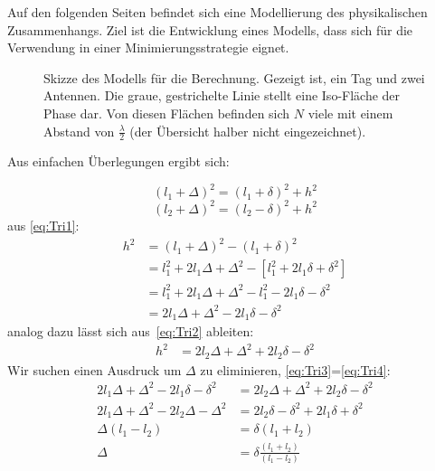 Auf den folgenden Seiten befindet sich eine Modellierung des physikalischen Zusammenhangs. Ziel ist die Entwicklung eines Modells, dass sich für die Verwendung in einer Minimierungsstrategie eignet.
\begin{figure}[h]
	\begin{center}
		\caption[Kurzeintrag]{Skizze des Modells für die Berechnung. Gezeigt ist, ein Tag und zwei Antennen. Die graue, gestrichelte Linie stellt eine Iso-Fläche der Phase dar. Von diesen Flächen befinden sich $N$ viele mit einem Abstand von $\frac{\lambda}{2}$ (der Übersicht halber nicht eingezeichnet).}
		
		
	\end{center}
\end{figure}

Aus einfachen Überlegungen ergibt sich:

\begin{equation}\label{eq:Tri1}
(l_1+\Delta)^2 = (l_1+\delta)^2+h^2
\end{equation}
\begin{equation}\label{eq:Tri2}
(l_2+\Delta)^2 = (l_2-\delta)^2+h^2
\end{equation}
%
aus \eqref{eq:Tri1}:
\begin{align}
h^2 &= (l_1+\Delta)^2 - (l_1+\delta)^2\\
	&= l_1^2 + 2l_1\Delta + \Delta^2 -[ l_1^2 + 2 l_1 \delta + \delta^2]\nonumber\\
	&= l_1^2 + 2l_1\Delta + \Delta^2 - l_1^2 - 2 l_1 \delta - \delta^2	\nonumber\\
	&= 2l_1\Delta + \Delta^2 - 2 l_1 \delta - \delta^2 \label{eq:Tri3}
\end{align}
%
analog dazu lässt sich aus~\eqref{eq:Tri2} ableiten:
%
\begin{align}
h^2 &= 2l_2\Delta + \Delta^2 + 2 l_2 \delta - \delta^2 \label{eq:Tri4}
\end{align}
%
Wir suchen einen Ausdruck um $\Delta$ zu eliminieren, \eqref{eq:Tri3}=\eqref{eq:Tri4}:
%
\begin{align}
	2l_1\Delta + \Delta^2 - 2 l_1 \delta - \delta^2 &=  2l_2\Delta + \Delta^2 + 2 l_2 \delta - \delta^2 \nonumber \\
	2l_1\Delta + \Delta^2 - 2l_2\Delta - \Delta^2&= 2 l_2 \delta - \delta^2 +2l_1\delta +\delta^2 \nonumber \\
	\Delta(l_1 - l_2  ) &= \delta (l_1+l_2) \nonumber \\
	\Delta &= \delta\frac{(l_1 + l_2)}{(l_1 - l_2)} \label{eq:Tri5}
\end{align}


